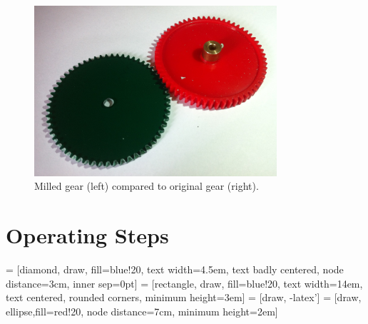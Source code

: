 \begin{figure}[ht!]
\centering
\includegraphics[width=90mm]{resources/gear_comparison.jpg}
\caption{Milled gear (left) compared to original gear (right).}
\label{fig:gearcomparison}
\end{figure}

\section{Operating Steps}

 = [diamond, draw, fill=blue!20, 
    text width=4.5em, text badly centered, node distance=3cm, inner sep=0pt]
 = [rectangle, draw, fill=blue!20, 
    text width=14em, text centered, rounded corners, minimum height=3em]
 = [draw, -latex']
 = [draw, ellipse,fill=red!20, node distance=7cm,
    minimum height=2em]
    
